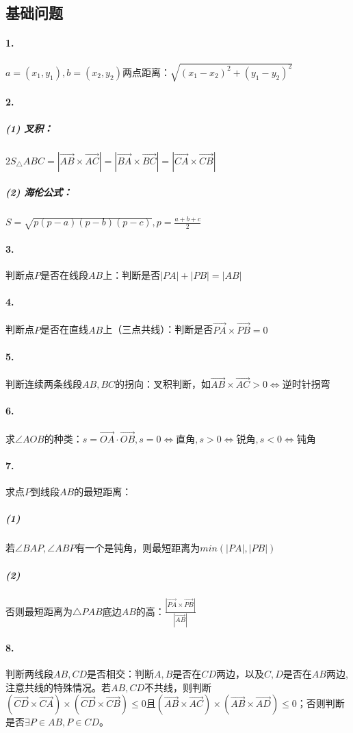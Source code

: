 \documentclass[]{cpp}
\renewcommand{\Vec}{\overrightarrow}
\begin{document}
\subsection{基础问题}
\paragraph{1.} $a=(x_1,y_1),b=(x_2,y_2)$两点距离：$\sqrt{(x_1-x_2)^2+(y_1-y_2)^2}$
\paragraph{2.}
\subparagraph{(1) 叉积：} $2S_\triangle{ABC}=|\Vec{AB}\times\Vec{AC}|=|\Vec{BA}\times\Vec{BC}|=|\Vec{CA}\times\Vec{CB}|$
\subparagraph{(2) 海伦公式：} $S=\sqrt{p(p-a)(p-b)(p-c)},p=\frac{a+b+c}{2}$
\paragraph{3.} 判断点$P$是否在线段$AB$上：判断是否$|PA|+|PB|=|AB|$
\paragraph{4.} 判断点$P$是否在直线$AB$上（三点共线）：判断是否$\Vec{PA}\times\Vec{PB}=0$
\paragraph{5.} 判断连续两条线段$AB,BC$的拐向：叉积判断，如$\Vec{AB}\times\Vec{AC}>0\iff$逆时针拐弯
\paragraph{6.} 求$\angle{AOB}$的种类：$s=\Vec{OA}\cdot\Vec{OB},s=0\iff\mbox{直角},s>0\iff\mbox{锐角},s<0\iff\mbox{钝角}$
\paragraph{7.} 求点$P$到线段$AB$的最短距离：
\subparagraph{(1)} 若$\angle{BAP},\angle{ABP}$有一个是钝角，则最短距离为$min(|PA|,|PB|)$
\subparagraph{(2)} 否则最短距离为$\triangle{PAB}$底边$AB$的高：$\frac{|\Vec{PA}\times\Vec{PB}|}{|\Vec{AB}|}$
\paragraph{8.} 判断两线段$AB,CD$是否相交：判断$A,B$是否在$CD$两边，以及$C,D$是否在$AB$两边,注意共线的特殊情况。若$AB,CD$不共线，则判断$(\Vec{CD}\times\Vec{CA})\times(\Vec{CD}\times\Vec{CB})\le0$且$(\Vec{AB}\times\Vec{AC})\times(\Vec{AB}\times\Vec{AD})\le0$；否则判断是否$\exists P \in AB,P\in CD$。
\end{document}
